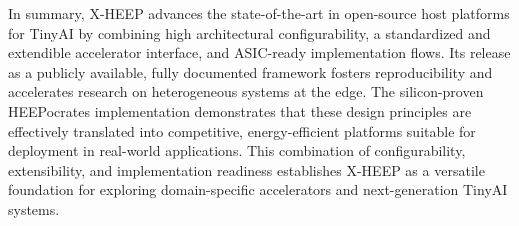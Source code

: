         In summary, \mbox{X-HEEP} advances the state-of-the-art in open-source host platforms for TinyAI by combining high architectural configurability, a standardized and extendible accelerator interface, and ASIC-ready implementation flows. Its release as a publicly available, fully documented framework fosters reproducibility and accelerates research on heterogeneous systems at the edge. The silicon-proven \mbox{HEEPocrates} implementation demonstrates that these design principles are effectively translated into competitive, energy-efficient platforms suitable for deployment in real-world applications. This combination of configurability, extensibility, and implementation readiness establishes \mbox{X-HEEP} as a versatile foundation for exploring domain-specific accelerators and next-generation TinyAI systems.
